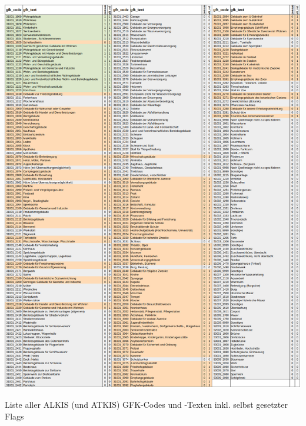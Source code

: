 	
	\begin{table}[h]
		\centering
		\includegraphics[width=\linewidth]{./Medien/tables/gfk_codes_texts_flags_all.png}
		\caption{Liste aller ALKIS (und ATKIS) GFK-Codes und -Texten inkl. selbst gesetzter Flags \cite{web_download_alkis_gebaeudefunktion_code_definition}\cite{web_github_repo_code}}
		\label{tab:gfk_codes_texte_flags_all}
	\end{table}
	
		
	
	
